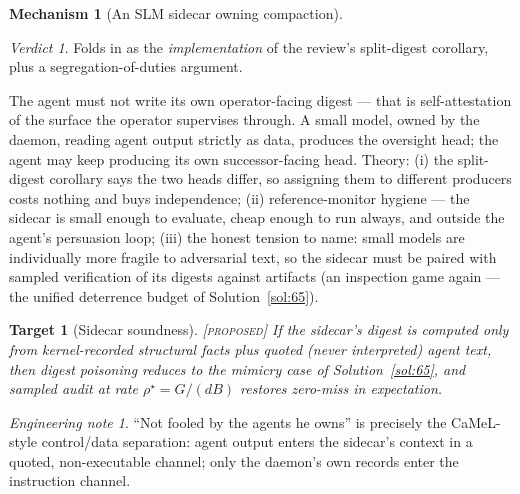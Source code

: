 \documentclass[11pt,a4paper]{article}
\newtheorem{target}{Target}[section]
\theoremstyle{definition}
\newtheorem{mech}{Mechanism}
\theoremstyle{remark}
\newtheorem*{verdict}{Verdict}
\newtheorem*{note}{Engineering note}
\newcommand{\grade}[1]{\textsc{[#1]}}
\begin{document}
\begin{mech}[An SLM sidecar owning compaction]
\begin{verdict} Folds in as the \emph{implementation} of the review's split-digest corollary, plus a segregation-of-duties argument. \end{verdict}
The agent must not write its own operator-facing digest --- that is self-attestation of the surface the operator supervises through. A small model, owned by the daemon, reading agent output strictly as data, produces the oversight head; the agent may keep producing its own successor-facing head. Theory: (i) the split-digest corollary says the two heads differ, so assigning them to different producers costs nothing and buys independence; (ii) reference-monitor hygiene --- the sidecar is small enough to evaluate, cheap enough to run always, and outside the agent's persuasion loop; (iii) the honest tension to name: small models are individually more fragile to adversarial text, so the sidecar must be paired with sampled verification of its digests against artifacts (an inspection game again --- the unified deterrence budget of Solution~\ref{sol:65}).
\begin{target}[Sidecar soundness]\grade{proposed} If the sidecar's digest is computed only from kernel-recorded structural facts plus quoted (never interpreted) agent text, then digest poisoning reduces to the mimicry case of Solution~\ref{sol:65}, and sampled audit at rate $\rho^\star = G/(dB)$ restores zero-miss in expectation. \end{target}
\begin{note} ``Not fooled by the agents he owns'' is precisely the CaMeL-style control/data separation: agent output enters the sidecar's context in a quoted, non-executable channel; only the daemon's own records enter the instruction channel. \end{note}
\end{mech}
\end{document}
